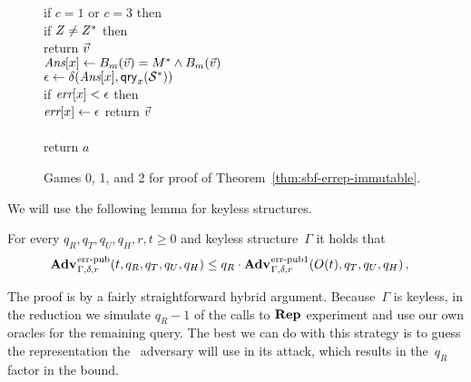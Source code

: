 \begin{figure*}
{{    if $c=1$ or $c=3$ then\\
    \tab if $Z \ne Z^*$  then\\
    \tab return $\vec{v}$\\
    \tab $\textit{Ans}[x] \gets {B}_m(\vec{v}) = M^* \wedge {B}_m(\vec{v})$\\
    \tab $\epsilon \gets \delta(\textit{Ans}[x],\mathsf{qry}_x(\mathcal{S}^*))$\\
    \tab if $\textit{err}[x] < \epsilon$ then\\
    \tab\tab $\textit{err}[x] \gets \epsilon$
    }
    return $\vec{v}$
}
{
  \vspace{-7pt}
  \
      \hfill {} \\[2pt]
    \\[2pt]
    return $a$
}
\caption{Games 0, 1, and 2 for proof of Theorem~\ref{thm:sbf-errep-immutable}.}
\label{fig:sbf-errep-immutable/games}
\end{figure*}

We will use the following lemma for keyless structures.

\begin{lemma}\label{thm:lemma1}
  For every $q_R, q_T, q_U, q_H, r, t \geq 0$ and keyless structure~$\Gamma$ it
  holds that
  \begin{eqnarray*}
    \begin{aligned}
      \Adv{\errep}_{\Gamma,\delta,r}(t,\,&q_R, q_T, q_U, q_H) \leq q_R \cdot \Adv{\errep1}_{\Gamma,\delta,r}(O(t), q_T, q_U, q_H) \,,
    \end{aligned}
  \end{eqnarray*}
\end{lemma}
%
\noindent
The proof is by a fairly straightforward hybrid argument. Because~$\Gamma$ is
keyless, in the reduction we simulate $q_R-1$ of the calls to $\textup{\textbf{Rep}}\hspace{0.5pt}$ experiment
and use our own oracles for the remaining query. The best we can do with this
strategy is to guess the representation the \errep\ adversary will use in
its attack, which results in the~$q_R$ factor in the bound.

